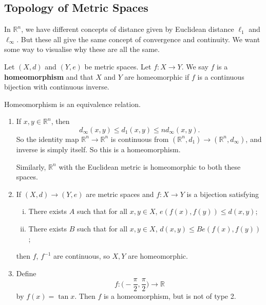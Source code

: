 \documentclass[12pt]{article}
\begin{document}
\subsection{Topology of Metric Spaces}%
\label{sub:topology_of_metric_spaces}

In $\mathbb{R}^{n}$, we have different concepts of distance given by Euclidean distance $\ell_1$ and $\ell_{\infty}$. But these all give the same concept of convergence and continuity. We want some way to visualise why these are all the same.

\begin{definition}
	Let $(X, d)$ and $(Y, e)$ be metric spaces. Let $f : X \to Y$. We say $f$ is a \textbf{homeomorphism} and that $X$ and $Y$ are homeomorphic if $f$ is a continuous bijection with continuous inverse.
\end{definition}

\begin{remark}
	Homeomorphism is an equivalence relation.
\end{remark}

\begin{exbox}
	\begin{enumerate}[1.]
		\item If $x, y \in \mathbb{R}^{n}$, then
			\[
				d_{\infty}(x, y) \leq d_1(x, y) \leq n d_{\infty}(x, y)
			.\]
			So the identity map $\mathbb{R}^{n} \to \mathbb{R}^{n}$ is continuous from $(\mathbb{R}^{n}, d_1 ) \to (\mathbb{R}^{n}, d_{\infty})$, and inverse is simply itself. So this is a homeomorphism.

			Similarly, $\mathbb{R}^{n}$ with the Euclidean metric is homeomorphic to both these spaces.
		\item If $(X, d) \to (Y, e)$ are metric spaces and $f : X \to Y$ is a bijection satisfying
			\begin{enumerate}[(i)]
				\item There exists $A$ such that for all $x, y \in X$, $e(f(x), f(y)) \leq d(x, y)$;
				\item There exists $B$ such that for all $x, y \in X$, $d(x, y) \leq Be(f(x), f(y))$;
			\end{enumerate}
			then $f$, $f^{-1}$ are continuous, so $X, Y$ are homeomorphic.
		\item Define
			\[
				f : \biggl( - \frac{\pi}{2} , \frac{\pi}{2} \biggr) \to \mathbb{R}
			\]
			by $f(x) = \tan x$. Then $f$ is a homeomorphism, but is not of type 2.
	\end{enumerate}
\end{exbox}
\end{document}
